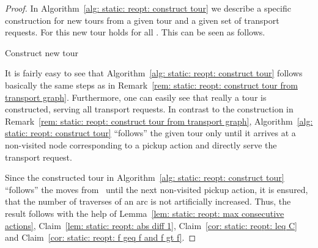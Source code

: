 \documentclass[english]{llncs}
\numberwithin{sublemma}{lemma}
\begin{document}
\begin{proof}
In Algorithm~\ref{alg: static: reopt: construct tour} we describe a specific construction for new tours from a given tour and a given set of transport requests.
For this new tour  holds for all .
This can be seen as follows.



\begin{algorithm}[ht]
\caption{Construct new tour}
\label{alg: static: reopt: construct tour}
\begin{algorithmic}[1]
                                                          \label{alg: static: reopt: construct tour: 4}
    \Else{}
    \EndIf{}
  \EndWhile{}
\State{\Return }
\end{algorithmic}
\end{algorithm}



It is fairly easy to see that Algorithm~\ref{alg: static: reopt: construct tour} follows basically the same steps as in Remark~\ref{rem: static: reopt: construct tour from transport graph}.
Furthermore, one can easily see that really a tour is constructed, serving all transport requests.
In contrast to the construction in Remark~\ref{rem: static: reopt: construct tour from transport graph}, Algorithm~\ref{alg: static: reopt: construct tour} ``follows'' the given tour only until it arrives at a non-visited node corresponding to a pickup action and directly serve the transport request.




Since the constructed tour in Algorithm~\ref{alg: static: reopt: construct tour} ``follows'' the moves from~ until the next non-visited pickup action,
it is ensured, that the number of traverses of an arc is not artificially increased.
Thus, the result follows with the help of Lemma~\ref{lem: static: reopt: max consecutive actions}, Claim~\ref{lem: static: reopt: abs diff 1}, Claim~\ref{cor: static: reopt: leq C} and Claim~\ref{cor: static: reopt: f geq f and f gt f}.
\end{proof}
\end{document}
